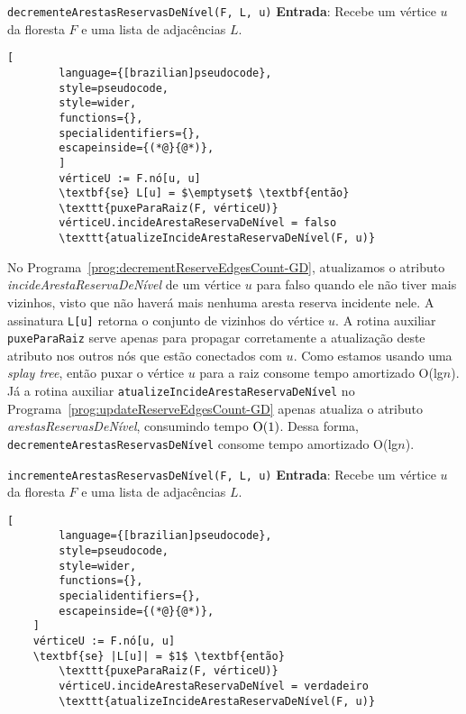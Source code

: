 \begin{programruledcaption}{\texttt{decrementeArestasReservasDeNível(F, L, u)} \label{prog:decrementReserveEdgesCount-GD}}
    \noindent\textbf{Entrada}: Recebe um vértice $u$ da floresta $F$ e uma lista de adjacências $L$.
    \vspace{-0.5\baselineskip}
    \begin{lstlisting}[
        language={[brazilian]pseudocode},
        style=pseudocode,
        style=wider,
        functions={},
        specialidentifiers={},
        escapeinside={(*@}{@*)},
        ]
        vérticeU := F.nó[u, u]
        \textbf{se} L[u] = $\emptyset$ \textbf{então} 
        \texttt{puxeParaRaiz(F, vérticeU)}
        vérticeU.incideArestaReservaDeNível = falso
        \texttt{atualizeIncideArestaReservaDeNível(F, u)}
    \end{lstlisting}
    \vspace{-0.5\baselineskip}
\end{programruledcaption}


No Programa~\ref{prog:decrementReserveEdgesCount-GD}, atualizamos o atributo \textit{incideArestaReservaDeNível} de um vértice $u$ para falso quando ele não tiver mais vizinhos, visto que não haverá mais nenhuma aresta reserva incidente nele. A assinatura \texttt{L[u]} retorna o conjunto de vizinhos do vértice $u$. A rotina auxiliar \texttt{puxeParaRaiz} serve apenas para propagar corretamente a atualização deste atributo nos outros nós que estão conectados com $u$. Como estamos usando uma \textit{splay tree}, então puxar o vértice $u$ para a raiz consome tempo amortizado O(lg$n$). Já a rotina auxiliar \texttt{atualizeIncideArestaReservaDeNível} no Programa~\ref{prog:updateReserveEdgesCount-GD} apenas atualiza o atributo \textit{arestasReservasDeNível}, consumindo tempo $\mathrm{O}(1)$. Dessa forma, \texttt{decrementeArestasReservasDeNível} consome tempo amortizado O(lg$n$).

\begin{programruledcaption}{\texttt{incrementeArestasReservasDeNível(F, L, u)} \label{prog:incrementReserveEdgesCount-GD}}
    \noindent\textbf{Entrada}: Recebe um vértice $u$ da floresta $F$ e uma lista de adjacências $L$.
    \vspace{-0.5\baselineskip}
    \begin{lstlisting}[
        language={[brazilian]pseudocode},
        style=pseudocode,
        style=wider,
        functions={},
        specialidentifiers={},
        escapeinside={(*@}{@*)},
    ]
    vérticeU := F.nó[u, u]
    \textbf{se} |L[u]| = $1$ \textbf{então} 
        \texttt{puxeParaRaiz(F, vérticeU)}
        vérticeU.incideArestaReservaDeNível = verdadeiro
        \texttt{atualizeIncideArestaReservaDeNível(F, u)}
    \end{lstlisting}
    \vspace{-0.5\baselineskip}
\end{programruledcaption}

